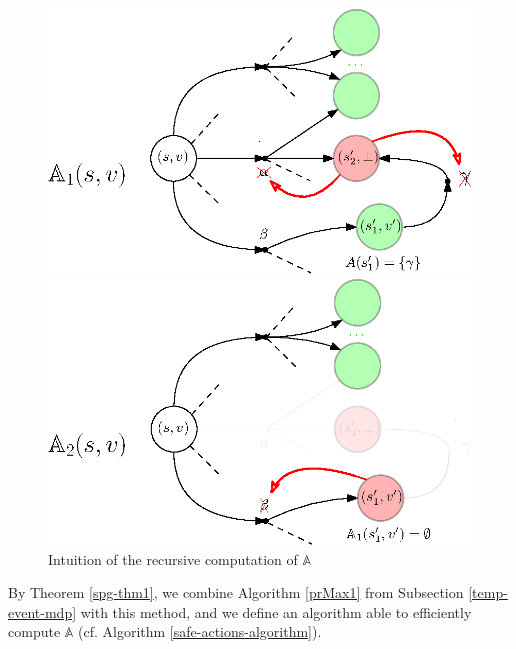 \begin{figure}[h]
  \begin{minipage}{0.5\linewidth}
    \centering
    \includegraphics[width=0.9\linewidth]{resources/attractor}
  \end{minipage}
  \begin{minipage}{0.5\linewidth}
    \centering
    \includegraphics[width=0.9\linewidth]{resources/attractor2}
  \end{minipage}
  \caption{Intuition of the recursive computation of $\mathbb{A}$}
\end{figure}

\noindent By Theorem \ref{spg-thm1}, we combine Algorithm \ref{prMax1} from Subsection \ref{temp-event-mdp} with this method, and we define an algorithm able to efficiently compute $\mathbb{A}$ (cf. Algorithm \ref{safe-actions-algorithm}).

